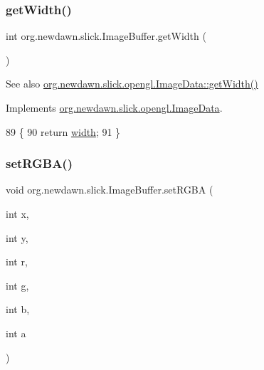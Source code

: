 \subsubsection{\texorpdfstring{get\+Width()}{getWidth()}}
{\footnotesize\ttfamily int org.\+newdawn.\+slick.\+Image\+Buffer.\+get\+Width (\begin{DoxyParamCaption}{ }\end{DoxyParamCaption})\hspace{0.3cm}{\ttfamily [inline]}}

\begin{DoxySeeAlso}{See also}
\mbox{\hyperlink{interfaceorg_1_1newdawn_1_1slick_1_1opengl_1_1_image_data_a59fd53f0ca1e501de35c1b2b4a7e69c5}{org.\+newdawn.\+slick.\+opengl.\+Image\+Data\+::get\+Width()}} 
\end{DoxySeeAlso}


Implements \mbox{\hyperlink{interfaceorg_1_1newdawn_1_1slick_1_1opengl_1_1_image_data_a59fd53f0ca1e501de35c1b2b4a7e69c5}{org.\+newdawn.\+slick.\+opengl.\+Image\+Data}}.


\begin{DoxyCode}
89                           \{
90         \textcolor{keywordflow}{return} \mbox{\hyperlink{classorg_1_1newdawn_1_1slick_1_1_image_buffer_a3d1afc42dba7eb1ce006daeec78852f3}{width}};
91     \}
\end{DoxyCode}
\mbox{\label{classorg_1_1newdawn_1_1slick_1_1_image_buffer_a99159381a5c45bc279cac0a77f7cb2dc}} 
\subsubsection{\texorpdfstring{set\+R\+G\+B\+A()}{setRGBA()}}
{\footnotesize\ttfamily void org.\+newdawn.\+slick.\+Image\+Buffer.\+set\+R\+G\+BA (\begin{DoxyParamCaption}\item[{int}]{x,  }\item[{int}]{y,  }\item[{int}]{r,  }\item[{int}]{g,  }\item[{int}]{b,  }\item[{int}]{a }\end{DoxyParamCaption})\hspace{0.3cm}{\ttfamily [inline]}}

